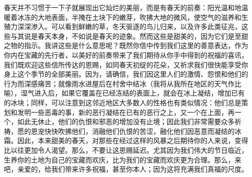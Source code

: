 春天并不习惯于一下子就展现出它灿烂的美丽，而是有春天的前奏：阳光温和地温暖着冰冻的大地表面，半掩在土块下的嫩芽，吹拂大地的微风，使空气的滋养和生殖力深深渗入。可以看到鲜嫩的草，冬天驱逐的鸟儿归来，以及许多此类征兆，这些与其说是春天本身，不如说是春天的迹象。然而这些是甜美的，因为它们是至甜之物的指示。我讲这些是什么意思呢？既然你信中传到我们这里的善意表达，作为你内在宝藏的先行者，以美好的前奏带来了我们期待从你手中得到的祝福的喜讯，我们既欢迎这些信所传达的恩赐，如同春天初绽的花朵，又祈求我们很快能享受你身上这个季节的全部美丽。因为，请确信，我们因这里人们的激情、怨恨和他们的行为而深感痛苦；就像雨水进屋后在村舍中结冰（我将从我所在地区的天气作比喻），湿气进入后，如果它覆盖在已经冻结的表面上，就会在冰上凝结，增加已有的冰块；同样，可以注意到这邻近地区大多数人的性格也有类似情况：他们总是策划和发明一些恶毒的事，新的恶行凝结在已有的恶行之上，又一个在上面，再一个，如此无休止，他们的仇恨和邪恶的增加没有止境；因此我们非常需要众多祈祷，愿的恩宠快快吹拂他们，消融他们仇恨的苦涩，融化他们因恶意而凝结的冰霜。因此，本来甜美的春天，对那些在经过这样的风暴之后期待你的人来说，变得比以往更加令人渴望。那么，不要让这恩赐延迟。尤其因为我们伟大的节日临近，生养你的土地为自己的宝藏而欢庆，比为我们的宝藏而欢庆更为合理。那么，来吧，亲爱的，给我们带来许多祝福，甚至你本人；因为这将充满我们真福的尺度。\par



\section{}

\par

\par


